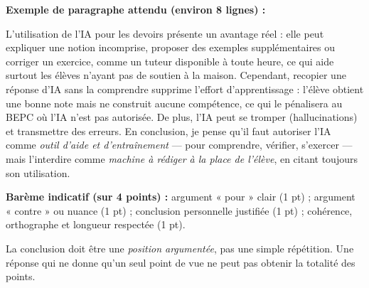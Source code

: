 \documentclass[11pt]{article}
\begin{document}
\begin{corrige}
\textbf{Exemple de paragraphe attendu (environ 8 lignes) :}

\og L'utilisation de l'IA pour les devoirs présente un avantage réel : elle peut expliquer une notion incomprise, proposer des exemples supplémentaires ou corriger un exercice, comme un tuteur disponible à toute heure, ce qui aide surtout les élèves n'ayant pas de soutien à la maison. Cependant, recopier une réponse d'IA sans la comprendre supprime l'effort d'apprentissage : l'élève obtient une bonne note mais ne construit aucune compétence, ce qui le pénalisera au BEPC où l'IA n'est pas autorisée. De plus, l'IA peut se tromper (hallucinations) et transmettre des erreurs. En conclusion, je pense qu'il faut autoriser l'IA comme \emph{outil d'aide et d'entraînement} — pour comprendre, vérifier, s'exercer — mais l'interdire comme \emph{machine à rédiger à la place de l'élève}, en citant toujours son utilisation. \fg

\textbf{Barème indicatif (sur 4 points) :} argument « pour » clair (1 pt) ; argument « contre » ou nuance (1 pt) ; conclusion personnelle justifiée (1 pt) ; cohérence, orthographe et longueur respectée (1 pt).
\end{corrige}

\begin{attention}
La conclusion doit être une \emph{position argumentée}, pas une simple répétition. Une réponse qui ne donne qu'un seul point de vue ne peut pas obtenir la totalité des points.
\end{attention}
\end{document}
